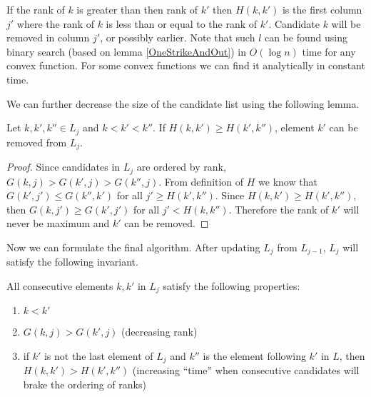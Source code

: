 If the rank of $k$ is greater than then rank of $k'$ then $H(k,k')$ is the first
column $j'$
 where the rank of $k$ is less than or equal to the
rank of $k'$. Candidate $k$ will be removed in column $j'$, or possibly earlier.  Note that
such $l$ can be found using binary search (based on lemma \ref{OneStrikeAndOut})
in $O(\log n)$ time for any convex function. For some convex functions we can
find it analytically in constant time.


We can further decrease the size of the candidate list using the following
lemma.

\begin{lemma}\label{TimeLemma}
Let $k,k',k''\in L_j$ and $k<k'<k''$. If $H(k,k')\geq H(k',k'')$, element $k'$ can be
removed from $L_j$.
\end{lemma}

\begin{proof}
Since candidates in $L_j$ are ordered by rank, $G(k,j)>G(k',j)>G(k'',j)$.
From definition of $H$ we know that 
$G(k',j')\leq G(k'',k')$ for  all $j'\geq H(k',k'')$. Since
$H(k,k')\geq H(k',k'')$, then $G(k,j')\geq G(k',j')$ for all $j'<H(k,k'')$.
Therefore the rank
of $k'$ will never be maximum and $k'$ can be removed.

\end{proof}

Now we can formulate the final algorithm. After updating $L_j$ from $L_{j-1}$,
$L_j$ will satisfy the following invariant.
\begin{invariant}\label{LogGapInvariant}
All consecutive elements $k,k'$ in $L_j$ satisfy the following properties:
\begin{enumerate}
\item $k<k'$
\item $G(k,j)>G(k',j)$ (decreasing rank)
\item if $k'$ is not the last element of $L_j$ and $k''$ is the element
following $k'$
in $L$, then $H(k,k')> H(k',k'')$ (increasing ``time'' when consecutive
candidates will brake the ordering of ranks)
\end{enumerate}
\end{invariant}


